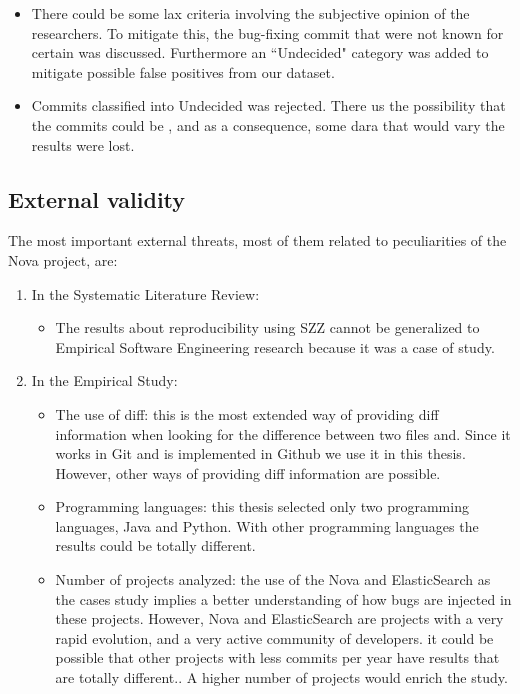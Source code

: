 \documentclass[a4paper, 12pt]{book}
\begin{document}
\begin{enumerate}
\begin{itemize}
			\item There could be some lax criteria involving the subjective opinion of the researchers. To mitigate this, the bug-fixing commit that were not known for certain was discussed. Furthermore an ``Undecided" category was added to mitigate possible false positives from our dataset.
			\item Commits classified into Undecided was rejected. There us the possibility that the commits could be \BIC, and as a consequence, some dara that would vary the results were lost. 		\end{itemize}
\end{enumerate}

\subsection{External validity}
The most important external threats, most of them related to peculiarities of the Nova project, are:
\begin{enumerate}
	\item In the Systematic Literature Review: 
		\begin{itemize}
			\item The results about reproducibility using SZZ cannot be generalized to Empirical Software Engineering research because it was a case of study.
		\end{itemize}
	\item {In the Empirical Study}: 
		\begin{itemize}
    			\item The use of diff: this is the most extended way of providing diff information when looking for the difference between two files and. Since it works in Git and is implemented in Github we use it in this thesis. However, other ways of providing diff information are possible.
   			 \item Programming languages: this thesis selected only two programming languages, Java and Python. With other programming languages the results could be totally different.
			 \item Number of projects analyzed: the use of the Nova and ElasticSearch as the cases study implies a better understanding of how bugs are injected in these projects. However, Nova and ElasticSearch are projects with a very rapid evolution, and a very active community of developers. it could be possible that other projects with less commits per year have results that are totally different.. A higher number of projects would enrich the study.
		\end{itemize}
\end{enumerate}
\end{document}
